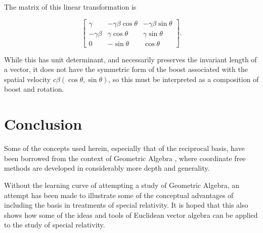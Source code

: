 The matrix of this linear transformation is

\begin{equation}\label{eqn:grahamSchmidtLorentz:840}
\begin{bmatrix}
\gamma & - \gamma \beta \cos\theta & - \gamma \beta \sin\theta \\
-\gamma \beta & \gamma \cos\theta & \gamma \sin\theta \\
0 & -\sin\theta & \cos\theta
\end{bmatrix}.
\end{equation}

While this has unit determinant, and necessarily preserves the invariant length of a vector, it does not have the symmetric form of the boost associated with the spatial velocity $c \beta (\cos\theta, \sin\theta)$, so this must be interpreted as a composition of boost and rotation.


\section{Conclusion}

Some of the concepts used herein, especially that of the reciprocal basis, have been borrowed from the context of Geometric Algebra
\citep{doran2003gap}
, where coordinate free methods are developed in considerably more depth and generality.

Without the learning curve of attempting a study of Geometric Algebra, an attempt has been made to illustrate some of the conceptual advantages of including the basis in treatments of special relativity.  It is hoped that this also shows how some of the ideas and tools of Euclidean vector algebra can be applied to the study of special relativity.

\EndArticle
